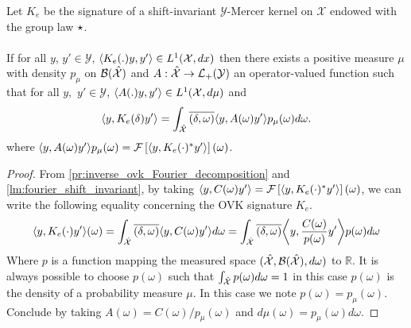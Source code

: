 \begin{proposition}
\label{pr:spectral}
Let $K_e$ be the signature of a shift-invariant $\mathcal{Y}$-Mercer kernel on $\mathcal{X}$ endowed with the group law $\star$.
\paragraph{}
If for all $y$, $y' \in\mathcal{Y}$, $\langle K_e(.)y,y'\rangle\in L^1(\mathcal{X},dx)$ then there exists a positive measure $\mu$ with density $p_{\mu}$ on $\mathcal{B}(\mathcal{\hat{\mathcal{X}}})$ and $A:\hat{\mathcal{X}}\to \mathcal{L}_+(\mathcal{Y})$ an operator-valued function such that for all $y,$ $y'\in\mathcal{Y}$, $\langle A(.)y,y'\rangle\in L^1(\mathcal{X},d\mu)$ and
\begin{dmath*}
\inner{y, K_e(\delta)y'}=\int_{\dual{\mathcal{X}}}\conj{\pairing{\delta, \omega}}\inner{y, A(\omega)y'}p_{\mu}(\omega)d\omega.
\end{dmath*}
where $\langle y, A(\omega)y'\rangle p_{\mu}(\omega) = \mathcal{F}\left[\langle y, K_e(\cdot)^*y'\rangle\right](\omega)$.
\end{proposition}
\begin{proof}
From \cref{pr:inverse_ovk_Fourier_decomposition} and \cref{lm:fourier_shift_invariant}, by taking $\langle y,C(\omega)y'\rangle = \mathcal{F}\left[\langle y, K_e(\cdot)^*y'\rangle\right](\omega)$, we can write the following equality concerning the \acs{OVK} signature $K_e$. 
\begin{dmath*}
\inner{y, K_e(\cdot)y'}(\omega)=
\int_{\dual{\mathcal{X}}}\conj{\pairing{\delta, \omega}}\inner{y, C(\omega)y'}d\omega
=\int_{\dual{\mathcal{X}}}\conj{\pairing{\delta, \omega}}\inner*{y, \frac{C(\omega)}{p(\omega)}y'}p(\omega)d\omega
\end{dmath*}
Where $p$ is a function mapping the measured space $(\hat{\mathcal{X}}, \mathcal{B}(\hat{\mathcal{X}}), d\omega)$ to $\mathbb{R}$. It is always possible to choose $p(\omega)$ such that $\int_{\hat{\mathcal{X}}}p(\omega)d\omega=1$ in this case $p(\omega)$ is the density of a probability measure $\mu$. In this case we note $p(\omega)=p_{\mu}(\omega)$. Conclude by taking $A(\omega)=C(\omega)/p_\mu(\omega)$ and $d\mu(\omega)=p_\mu(\omega)d\omega$.
\end{proof}
